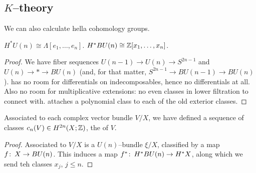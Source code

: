 




\begin{subappendices}

\section{$K$--theory}







We can also calculate hella cohomology groups.

\begin{theorem}
$H^* U(n) \cong \Lambda[e_1, \ldots, e_n]$.  $H^* BU(n) \cong \mathbb Z[x_1, \ldots, x_n]$.
\end{theorem}
\begin{proof}
We have fiber sequences $U(n-1) \to U(n) \to S^{2n-1}$ and $U(n) \to * \to BU(n)$ (and, for that matter, $S^{2n-1} \to BU(n-1) \to BU(n)$).   has no room for differentials on indecomposables, hence no differentials at all.  Also no room for multiplicative extensions: no even classes in lower filtration to connect with.   attaches a polynomial class to each of the old exterior classes.
\end{proof}

\begin{corollary}
Associated to each complex vector bundle $V / X$, we have defined a sequence of classes $c_n(V) \in H^{2n}(X; \mathbb Z)$, the  of $V$.
\end{corollary}
\begin{proof}
Associated to $V/X$ is a $U(n)$--bundle $\xi / X$, classified by a map $f\colon\thinspace X \to BU(n)$.  This induces a map $f^*\colon\thinspace H^* BU(n) \to H^* X$, along which we send teh classes $x_j$, $j \le n$.
\end{proof}


\end{subappendices}
